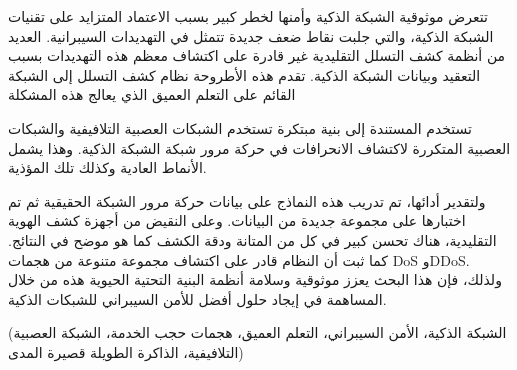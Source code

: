 \begin{abstractAr}





		تتعرض موثوقية الشبكة الذكية وأمنها لخطر كبير بسبب الاعتماد المتزايد على تقنيات الشبكة الذكية، والتي جلبت نقاط ضعف جديدة تتمثل في التهديدات السيبرانية. العديد من أنظمة كشف التسلل التقليدية  غير قادرة على اكتشاف معظم هذه التهديدات بسبب التعقيد وبيانات الشبكة الذكية. تقدم هذه الأطروحة نظام كشف التسلل إلى الشبكة القائم على التعلم العميق  الذي يعالج هذه المشكلة
		
		  تستخدم  المستندة إلى  بنية مبتكرة تستخدم الشبكات العصبية التلافيفية  والشبكات العصبية المتكررة  لاكتشاف الانحرافات في حركة مرور شبكة الشبكة الذكية. وهذا يشمل الأنماط العادية وكذلك تلك المؤذية.
		
		  ولتقدير أدائها، تم تدريب هذه النماذج على بيانات حركة مرور الشبكة الحقيقية ثم تم اختبارها على مجموعة جديدة من البيانات. وعلى النقيض من أجهزة كشف الهوية التقليدية، هناك تحسن كبير في كل من المتانة ودقة الكشف كما هو موضح في النتائج. كما ثبت أن النظام قادر على اكتشاف مجموعة متنوعة من هجمات DoS وDDoS. ولذلك، فإن هذا البحث يعزز موثوقية وسلامة أنظمة البنية التحتية الحيوية هذه من خلال المساهمة في إيجاد حلول أفضل للأمن السيبراني للشبكات الذكية.
		
		

\end{abstractAr}

\begin{keywordsAr}
	(الشبكة الذكية، الأمن السيبراني، التعلم العميق، هجمات حجب الخدمة، الشبكة العصبية التلافيفية، الذاكرة الطويلة قصيرة المدى)
\end{keywordsAr}

\newpage